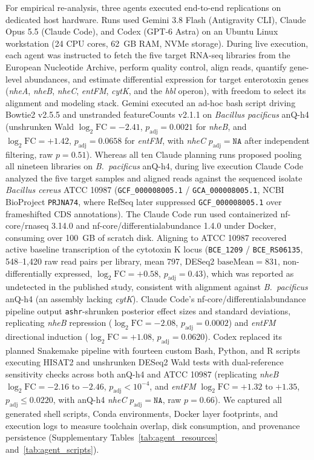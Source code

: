 \documentclass[11pt,letterpaper]{article}
\begin{document}
For empirical re-analysis, three agents executed end-to-end replications on dedicated host hardware. Runs used Gemini 3.8 Flash (Antigravity CLI), Claude Opus 5.5 (Claude Code), and Codex (GPT-6 Astra) on an Ubuntu Linux workstation (24 CPU cores, 62~GB RAM, NVMe storage). During live execution, each agent was instructed to fetch the five target RNA-seq libraries from the European Nucleotide Archive, perform quality control, align reads, quantify gene-level abundances, and estimate differential expression for target enterotoxin genes (\textit{nheA}, \textit{nheB}, \textit{nheC}, \textit{entFM}, \textit{cytK}, and the \textit{hbl} operon), with freedom to select its alignment and modeling stack. Gemini executed an ad-hoc bash script driving Bowtie2 v2.5.5 and unstranded featureCounts v2.1.1 on \textit{Bacillus pacificus} anQ-h4 (unshrunken Wald $\log_2\text{FC} = -2.41$, $p_{\text{adj}} = 0.0021$ for \textit{nheB}, and $\log_2\text{FC} = +1.42$, $p_{\text{adj}} = 0.0658$ for \textit{entFM}, with \textit{nheC} $p_{\text{adj}} = \texttt{NA}$ after independent filtering, raw $p = 0.51$). Whereas all ten Claude planning runs proposed pooling all nineteen libraries on \textit{B.\ pacificus} anQ-h4, during live execution Claude Code analyzed the five target samples and aligned reads against the sequenced isolate \textit{Bacillus cereus} ATCC 10987 (\texttt{GCF\_000008005.1} / \texttt{GCA\_000008005.1}, NCBI BioProject \texttt{PRJNA74}, where RefSeq later suppressed \texttt{GCF\_000008005.1} over frameshifted CDS annotations). The Claude Code run used containerized nf-core/rnaseq 3.14.0 and nf-core/differentialabundance 1.4.0 under Docker, consuming over 100~GB of scratch disk. Aligning to ATCC 10987 recovered active baseline transcription of the cytotoxin K locus (\texttt{BCE\_1209} / \texttt{BCE\_RS06135}, 548--1,420 raw read pairs per library, mean 797, DESeq2 $\text{baseMean} = 831$, non-differentially expressed, $\log_2\text{FC} = +0.58$, $p_{\text{adj}} = 0.43$), which was reported as undetected in the published study, consistent with alignment against \textit{B.\ pacificus} anQ-h4 (an assembly lacking \textit{cytK}). Claude Code's nf-core/differentialabundance pipeline output \texttt{ashr}-shrunken posterior effect sizes and standard deviations, replicating \textit{nheB} repression ($\log_2\text{FC} = -2.08$, $p_{\text{adj}} = 0.0002$) and \textit{entFM} directional induction ($\log_2\text{FC} = +1.08$, $p_{\text{adj}} = 0.0620$). Codex replaced its planned Snakemake pipeline with fourteen custom Bash, Python, and R scripts executing HISAT2 and unshrunken DESeq2 Wald tests with dual-reference sensitivity checks across both anQ-h4 and ATCC 10987 (replicating \textit{nheB} $\log_2\text{FC} = -2.16$ to $-2.46$, $p_{\text{adj}} < 10^{-4}$, and \textit{entFM} $\log_2\text{FC} = +1.32$ to $+1.35$, $p_{\text{adj}} \le 0.0220$, with anQ-h4 \textit{nheC} $p_{\text{adj}} = \texttt{NA}$, raw $p = 0.66$). We captured all generated shell scripts, Conda environments, Docker layer footprints, and execution logs to measure toolchain overlap, disk consumption, and provenance persistence (Supplementary Tables~\ref{tab:agent_resources} and~\ref{tab:agent_scripts}).
\end{document}
